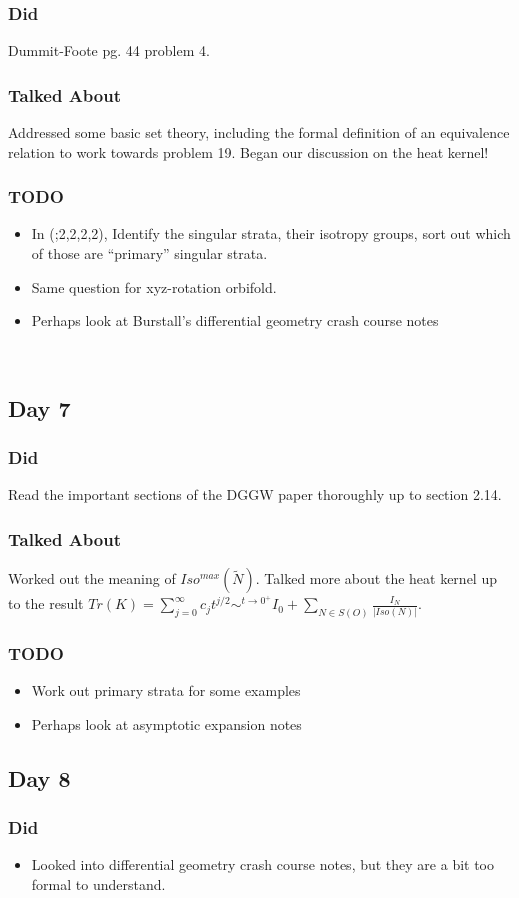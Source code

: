 \documentclass[11pt]{article}
\begin{document}
\subsubsection{Did}
Dummit-Foote pg. 44 problem 4.
\subsubsection{Talked About}
Addressed some basic set theory, including the formal definition of an equivalence relation to work towards problem 19.
Began our discussion on the heat kernel!
\subsubsection{TODO}
\begin{itemize}
    \item In (;2,2,2,2), Identify the singular strata, their isotropy groups, sort out which of those are ``primary'' singular strata.
    \item Same question for xyz-rotation orbifold.
    \item Perhaps look at Burstall's differential geometry crash course notes
\end{itemize}
\
\subsection{Day 7}
\subsubsection{Did}
Read the important sections of the DGGW paper thoroughly up to section 2.14.
\subsubsection{Talked About}
Worked out the meaning of $Iso^{max}(\tilde{N})$. Talked more about the heat kernel up to the result $Tr(K) = \sum^{\infty}_{j=0}c_jt^{j/2} \sim^{t \rightarrow 0^+} I_0 + \sum_{N \in S(O)}\frac{I_N}{\vert{Iso(N)}\vert}$.
\subsubsection{TODO}
\begin{itemize}
    \item Work out primary strata for some examples
    \item Perhaps look at asymptotic expansion notes
\end{itemize}
\subsection{Day 8}
\subsubsection{Did}
\begin{itemize}
    \item Looked into differential geometry crash course notes, but they are a bit too formal to understand.

\end{itemize}
\end{document}
